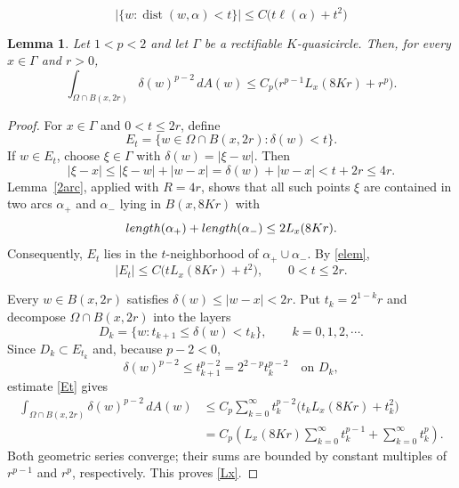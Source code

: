 \documentclass[10pt,a4paper]{amsart}
\newtheorem{lemma}{Lemma}
\newcommand{\dist}{\operatorname{dist}}
\begin{document}
\begin{equation}\label{elem}
  \bigl|\{w:\dist(w,\alpha)<t\}\bigr|
  \le C\bigl(t\ell(\alpha)+t^2\bigr)
\end{equation}

\begin{lemma}\label{8Kr}
Let $1<p<2$ and let $\Gamma$ be a rectifiable $K$-quasicircle.  Then,
for every $x\in\Gamma$ and $r>0$,
\begin{equation}\label{Lx}
  \int_{\Omega\cap B(x,2r)}\delta(w)^{p-2}\,dA(w)
  \leq C_p\bigl(r^{p-1}L_x(8K r)+r^p\bigr). 
\end{equation}
\end{lemma}

\begin{proof}
For $x\in\Gamma$ and $0<t\le2r$, define
\[
  E_t=\{w\in\Omega\cap B(x,2r):\delta(w)<t\}.
\]
If $w\in E_t$, choose $\xi\in\Gamma$ with
$\delta(w)=|\xi-w|$.  Then
\[
  |\xi-x|
  \le|\xi-w|+|w-x|
  =\delta(w)+|w-x|
  <t+2r\le4r.
\]
Lemma~\ref{2arc}, applied with $R=4r$, shows that all such points $\xi$ are
contained in two arcs $\alpha_+$ and $\alpha_-$ lying in
$B(x,8Kr)$ with
\[
  {\rm length}(\alpha_+)+ {\rm length}(\alpha_-)
  \le2L_x(8K r).
\]
Consequently, $E_t$ lies in the $t$-neighborhood of
$\alpha_+\cup\alpha_-$.  By \eqref{elem},
\begin{equation}\label{Et}
  |E_t|\le C\bigl(tL_x(8K r)+t^2\bigr),
  \qquad 0<t\le2r.
\end{equation}

Every $w\in B(x,2r)$ satisfies $\delta(w)\le|w-x|<2r$.  Put
$t_k=2^{1-k}r$ and decompose $\Omega\cap B(x,2r)$ into the layers
\[
  D_k=\{w:t_{k+1}\le\delta(w)<t_k\},
  \qquad k=0,1,2,\cdots.
\]
Since $D_k\subset E_{t_k}$ and, because $p-2<0$,
\[
\delta(w)^{p-2}\le t_{k+1}^{p-2}=2^{2-p}t_k^{p-2}
\quad\text{on }D_k,
\]
estimate \eqref{Et} gives
\begin{align*}
  \int_{\Omega\cap B(x,2r)}\delta(w)^{p-2}\,dA(w)
  &\le C_p\sum_{k=0}^\infty
  t_k^{p-2}\bigl(t_kL_x(8K r)+t_k^2\bigr)\\
  &=C_p\left(
  L_x(8K r)\sum_{k=0}^\infty t_k^{p-1}
  +\sum_{k=0}^\infty t_k^{p}
  \right).
\end{align*}
Both geometric series converge; their sums are bounded by constant
multiples of $r^{p-1}$ and $r^p$, respectively.  This proves \eqref{Lx}.
\end{proof}
\end{document}
